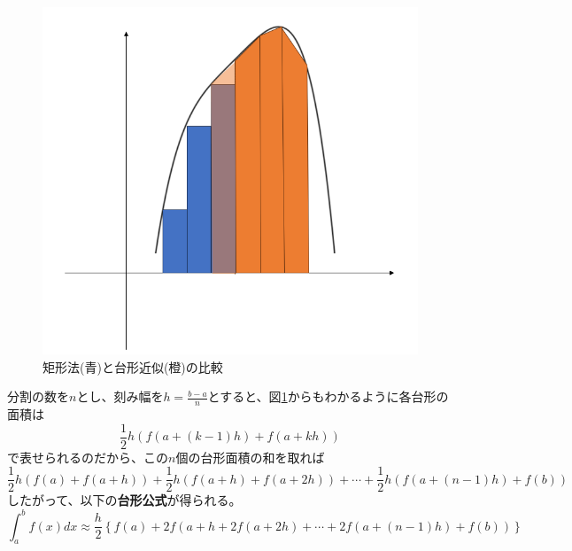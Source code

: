 \documentclass[a4j,dvipdfmx]{jsarticle}
\begin{document}
                \begin{figure}[h]
                    \centering
                    \includegraphics[scale=0.5]{img/QuuNote/trapezoidalRule.png}
                    \caption{矩形法(青)と台形近似(橙)の比較}\label{fig:矩形法と台形公式}
                \end{figure}

                分割の数を$n$とし、刻み幅を$h=\frac{b-a}{n}$とすると、図\ref{fig:矩形法と台形公式}からもわかるように各台形の面積は
                \begin{equation*}
                    \frac{1}{2}h(f(a+(k-1)h)+f(a+kh))
                \end{equation*}
                で表せられるのだから、この$n$個の台形面積の和を取れば
                \begin{equation*}
                    \frac{1}{2}h(f(a)+f(a+h))+\frac{1}{2}h(f(a+h)+f(a+2h))+\cdots+\frac{1}{2}h(f(a+(n-1)h)+f(b))
                \end{equation*}
                したがって、以下の\textbf{台形公式}が得られる。
                \begin{equation}
                    \int_{a}^{b}f(x)dx \approx \frac{h}{2}\left\{f(a)+2f(a+h+2f(a+2h)+\cdots+2f(a+(n-1)h)+f(b))\right\}\label{eq:台形公式}
                \end{equation}
\end{document}
